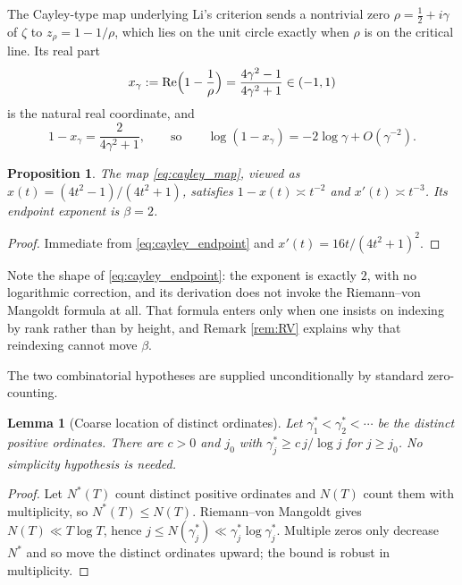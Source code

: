 \documentclass[11pt]{amsart}
\numberwithin{equation}{section}
\theoremstyle{plain}
\newtheorem{proposition}[theorem]{Proposition}
\newtheorem{lemma}[theorem]{Lemma}
\theoremstyle{definition}
\theoremstyle{remark}
\begin{document}
The Cayley-type map underlying Li's criterion \cite{Li1997,BombieriLagarias1999} sends a nontrivial
zero $\rho=\tfrac12+i\gamma$ of $\zeta$ to $z_{\rho}=1-1/\rho$, which lies on the unit circle exactly
when $\rho$ is on the critical line. Its real part
\begin{equation}
x_{\gamma}:=\operatorname{Re}\Bigl(1-\frac1\rho\Bigr)=\frac{4\gamma^{2}-1}{4\gamma^{2}+1}\in(-1,1)
\label{eq:cayley_map}
\end{equation}
is the natural real coordinate, and
\begin{equation}
1-x_{\gamma}=\frac{2}{4\gamma^{2}+1},
\qquad\text{so}\qquad
\log(1-x_{\gamma})=-2\log\gamma+O(\gamma^{-2}).
\label{eq:cayley_endpoint}
\end{equation}

\begin{proposition}
\label{prop:beta2}
The map \eqref{eq:cayley_map}, viewed as $x(t)=(4t^{2}-1)/(4t^{2}+1)$, satisfies
$1-x(t)\asymp t^{-2}$ and $x'(t)\asymp t^{-3}$. Its endpoint exponent is $\beta=2$.
\end{proposition}

\begin{proof}
Immediate from \eqref{eq:cayley_endpoint} and $x'(t)=16t/(4t^{2}+1)^{2}$.
\end{proof}

Note the shape of \eqref{eq:cayley_endpoint}: the exponent is exactly $2$, with no logarithmic
correction, and its derivation does not invoke the Riemann--von Mangoldt formula at all. That
formula enters only when one insists on indexing by rank rather than by height, and Remark
\ref{rem:RV} explains why that reindexing cannot move $\beta$.

The two combinatorial hypotheses are supplied unconditionally by standard zero-counting.

\begin{lemma}[Coarse location of distinct ordinates]
\label{lem:coarse}
Let $\gamma_{1}^{*}<\gamma_{2}^{*}<\cdots$ be the distinct positive ordinates. There are $c>0$ and
$j_{0}$ with $\gamma_{j}^{*}\ge c\,j/\log j$ for $j\ge j_{0}$. No simplicity hypothesis is needed.
\end{lemma}

\begin{proof}
Let $N^{*}(T)$ count distinct positive ordinates and $N(T)$ count them with multiplicity, so
$N^{*}(T)\le N(T)$. Riemann--von Mangoldt gives $N(T)\ll T\log T$, hence
$j\le N(\gamma_{j}^{*})\ll\gamma_{j}^{*}\log\gamma_{j}^{*}$. Multiple zeros only decrease $N^{*}$
and so move the distinct ordinates upward; the bound is robust in multiplicity.
\end{proof}
\end{document}
